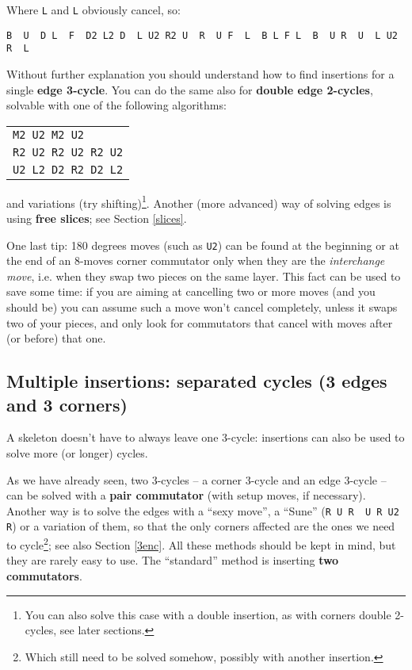\documentclass[11pt,a4paper]{book}
\newcommand{\p}{\textquotesingle}
\newcommand{\m}{\texttt}
\newcommand{\ps}{\p\,\,}
\begin{document}
Where \m L and \m{L\p} obviously cancel, so:

\begin{center}
\m{B\ps U\ps D L\ps F\ps D2 L2 D\ps L U2 R2 U\ps R\ps U F\ps L\ps B L F L\ps B\ps U R\ps U\ps L U2 R\ps L\p}
\end{center}

Without further explanation you should understand how to find insertions for a single \textbf{edge 3-cycle}. You can do the same also for \textbf{double edge 2-cycles}, solvable with one of the following algorithms:

\begin{center}
\begin{tabular}{l}
\m{M2 U2 M2 U2}\\
\m{R2 U2 R2 U2 R2 U2}\\
\m{U2 L2 D2 R2 D2 L2}
\end{tabular}
\end{center}

and variations (try shifting)\footnote{You can also solve this case with a double insertion, as with corners double 2-cycles, see later sections.}. Another (more advanced) way of solving edges is using \textbf{free slices}; see Section \ref{slices}.

One last tip: 180 degrees moves (such as \m{U2}) can be found at the beginning or at the end of an 8-moves corner commutator only when they are the \emph{interchange move}, i.e. when they swap two pieces on the same layer. This fact can be used to save some time: if you are aiming at cancelling two or more moves (and you should be) you can assume such a move won't cancel completely, unless it swaps two of your pieces, and only look for commutators that cancel with moves after (or before) that one.

\subsection{Multiple insertions: separated cycles (3 edges and 3 corners)}

A skeleton doesn't have to always leave one 3-cycle: insertions can also be used to solve more (or longer) cycles.

As we have already seen, two 3-cycles -- a corner 3-cycle and an edge 3-cycle -- can be solved with a \textbf{pair commutator} (with setup moves, if necessary). Another way is to solve the edges with a ``sexy move'', a ``Sune'' (\m{R U R\ps U R U2 R\p}) or a variation of them, so that the only corners affected are the ones we need to cycle\footnote{Which still need to be solved somehow, possibly with another insertion.}; see also Section \ref{3enc}. All these methods should be kept in mind, but they are rarely easy to use. The ``standard'' method is inserting \textbf{two commutators}.
\end{document}
